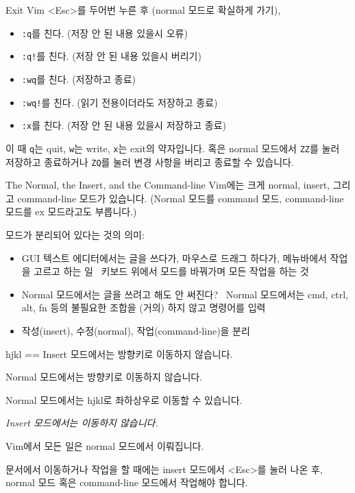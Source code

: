 \documentclass{beamer}
\begin{document}
\begin{frame}[fragile]{Exit Vim}
  <Esc>를 두어번 누른 후 (normal 모드로 확실하게 가기),\pause
  \begin{itemize}
    \item \verb/:q/를 친다. (저장 안 된 내용 있을시 오류)\pause
    \item \verb/:q!/를 친다. (저장 안 된 내용 있을시 버리기)\pause
    \item \verb/:wq/를 친다. (저장하고 종료)\pause
    \item \verb/:wq!/를 친다. (읽기 전용이더라도 저장하고 종료)\pause
    \item \verb/:x/를 친다. (저장 안 된 내용 있을시 저장하고 종료)\pause
  \end{itemize}
  이 때 \verb/q/는 \alert{q}uit, \verb/w/는 \alert{w}rite, \verb/x/는
  e\alert{x}it의 약자입니다.\pause
  혹은 normal 모드에서 \verb/ZZ/를 눌러 저장하고 종료하거나 \verb/ZQ/를 눌러
  변경 사항을 버리고 종료할 수 있습니다.
\end{frame}

\begin{frame}[fragile]{The Normal, the Insert, and the Command-line}
  Vim에는 크게 normal, insert, 그리고 command-line 모드가 있습니다.
  (Normal 모드를 command 모드, command-line 모드를 ex 모드라고도 부릅니다.)

  \pause
  모드가 분리되어 있다는 것의 의미:
  \begin{itemize}
    \item GUI 텍스트 에디터에서는 글을 쓰다가, 마우스로 드래그 하다가, 메뉴바에서
      작업을 고르고 하는 일 \pause\tra\, 키보드 위에서 모드를 바꿔가며 모든
      작업을 하는 것
    \item Normal 모드에서는 글을 쓰려고 해도 안 써진다? \pause\tra\, Normal
      모드에서는 cmd, ctrl, alt, fn 등의 불필요한 조합을 (거의) 하지 않고
      명령어를 입력\pause
    \item 작성(insert), 수정(normal), 작업(command-line)을 분리
  \end{itemize}
\end{frame}

\begin{frame}[fragile]{hjkl == \tla\tda\tua\tra}
  Insert 모드에서는 방향키로 이동하지 않습니다.\pause

  Normal 모드에서는 방향키로 이동하지 않습니다.\pause

  Normal 모드에서는 hjkl로 좌하상우로 이동할 수 있습니다.\pause

  \emph{Insert 모드에서는 이동하지 않습니다.}\pause

  \alert{\centering\large Vim에서 모든 일은 normal 모드에서 이뤄집니다.}\pause

  문서에서 이동하거나 작업을 할 때에는 insert 모드에서 <Esc>를 눌러 나온 후,
  normal 모드 혹은 command-line 모드에서 작업해야 합니다.
\end{frame}
\end{document}

